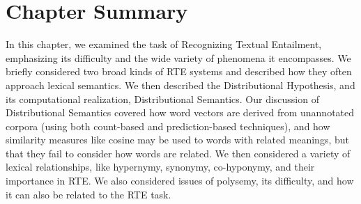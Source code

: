 \section{Chapter Summary}

In this chapter, we examined the task of Recognizing Textual Entailment,
emphasizing its difficulty and the wide variety of phenomena it encompasses.
We briefly considered two broad kinds of RTE systems and described how they
often approach lexical semantics. We then described the Distributional
Hypothesis, and its computational realization, Distributional Semantics.
Our discussion of Distributional Semantics covered how word vectors are derived
from unannotated corpora (using both count-based and prediction-based
techniques), and how similarity measures like cosine may be used to words with
related meanings, but that they fail to consider how words are related. We
then considered a variety of lexical relationships, like hypernymy, synonymy,
co-hyponymy, and their importance in RTE. We also considered issues of polysemy,
its difficulty, and how it can also be related to the RTE task.



